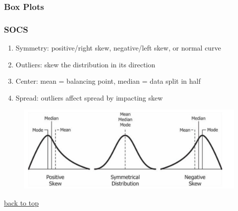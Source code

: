 \documentclass[12pt]{article}
\numberwithin{equation}{section}
\begin{document}
\subsubsection{Box Plots}
\subsubsection{SOCS}
\begin{enumerate}
    \item Symmetry: positive/right skew, negative/left skew, or normal curve
    \item Outliers: skew the distribution in its direction
    \item Center: mean = balancing point, median = data split in half
    \item Spread: outliers affect spread by impacting skew
\end{enumerate}
\begin{figure}[!ht]
    \centering
    \includegraphics[width=0.9\linewidth]{figures/skew.png}
\end{figure}

\noindent \begin{flushright} \hyperref[sec:top]{back to top} \end{flushright}
\end{document}
